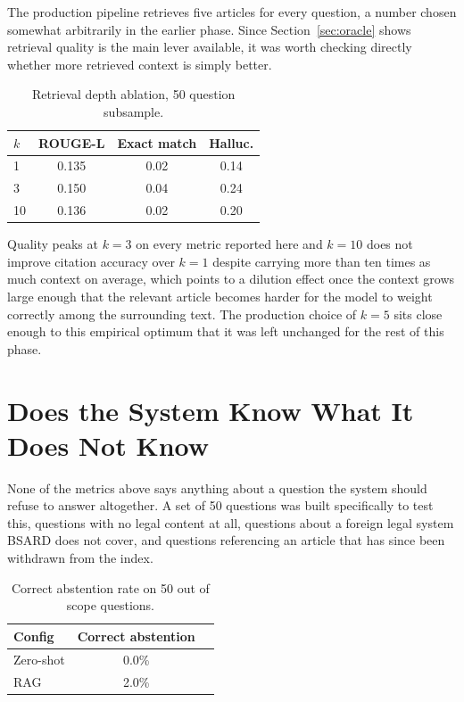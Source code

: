 \documentclass[11pt, a4paper]{article}
\begin{document}
The production pipeline retrieves five articles for every question, a number chosen somewhat arbitrarily in the earlier phase. Since Section~\ref{sec:oracle} shows retrieval quality is the main lever available, it was worth checking directly whether more retrieved context is simply better.

\begin{table}[H]
\centering
\small
\begin{tabular}{lccc}
\toprule
\textbf{$k$} & \textbf{ROUGE-L} & \textbf{Exact match} & \textbf{Halluc.} \\
\midrule
1 & 0.135 & 0.02 & 0.14 \\
3 & 0.150 & 0.04 & 0.24 \\
10 & 0.136 & 0.02 & 0.20 \\
\bottomrule
\end{tabular}
\caption{Retrieval depth ablation, 50 question subsample.}
\label{tab:kablation}
\end{table}

Quality peaks at $k=3$ on every metric reported here and $k=10$ does not improve citation accuracy over $k=1$ despite carrying more than ten times as much context on average, which points to a dilution effect once the context grows large enough that the relevant article becomes harder for the model to weight correctly among the surrounding text. The production choice of $k=5$ sits close enough to this empirical optimum that it was left unchanged for the rest of this phase.

\section{Does the System Know What It Does Not Know}

None of the metrics above says anything about a question the system should refuse to answer altogether. A set of 50 questions was built specifically to test this, questions with no legal content at all, questions about a foreign legal system BSARD does not cover, and questions referencing an article that has since been withdrawn from the index.

\begin{table}[H]
\centering
\small
\begin{tabular}{lcc}
\toprule
\textbf{Config} & \textbf{Correct abstention} \\
\midrule
Zero-shot & 0.0\% \\
RAG & 2.0\% \\
\bottomrule
\end{tabular}
\caption{Correct abstention rate on 50 out of scope questions.}
\label{tab:abstention}
\end{table}
\end{document}
